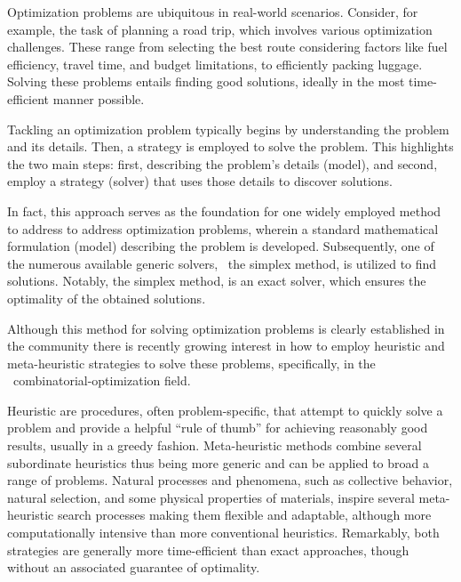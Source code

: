 
Optimization problems are ubiquitous in real-world scenarios. Consider, for
example, the task of planning a road trip, which involves various optimization
challenges. These range from selecting the best route considering factors like
fuel efficiency, travel time, and budget limitations, to efficiently packing
luggage. Solving these problems entails finding good solutions, ideally
in the most time-efficient manner possible.

Tackling an optimization problem typically begins by understanding the problem
and its details. Then, a strategy is employed to solve the problem. This
highlights the two main steps: first, describing the problem's details (model),
and second, employ a strategy (solver) that uses those details to discover
solutions.

In fact, this approach serves as the foundation for one widely employed method
to address to address optimization problems, wherein a standard mathematical
formulation (model) describing the problem is developed.  Subsequently, one of
the numerous available generic solvers,~\eg{} the simplex method, is utilized to
find solutions. Notably, the simplex method, is an exact solver, which ensures
the optimality of the obtained solutions.

Although this method for solving optimization problems is clearly established in
the community there is recently growing interest in how to employ heuristic and
meta-heuristic strategies to solve these problems, specifically, in the
~\acrfull{combinatorial-optimization} field.

Heuristic are procedures, often problem-specific, that attempt to quickly solve
a problem and provide a helpful ``rule of thumb'' for achieving reasonably good
results, usually in a greedy fashion. Meta-heuristic methods combine several
subordinate heuristics thus being more generic and can be applied to broad a
range of problems. Natural processes and phenomena, such as collective behavior,
natural selection, and some physical properties of materials, inspire several
meta-heuristic search processes making them flexible and adaptable, although
more computationally intensive than more conventional heuristics. Remarkably,
both strategies are generally more time-efficient than exact approaches, though
without an associated guarantee of optimality.


